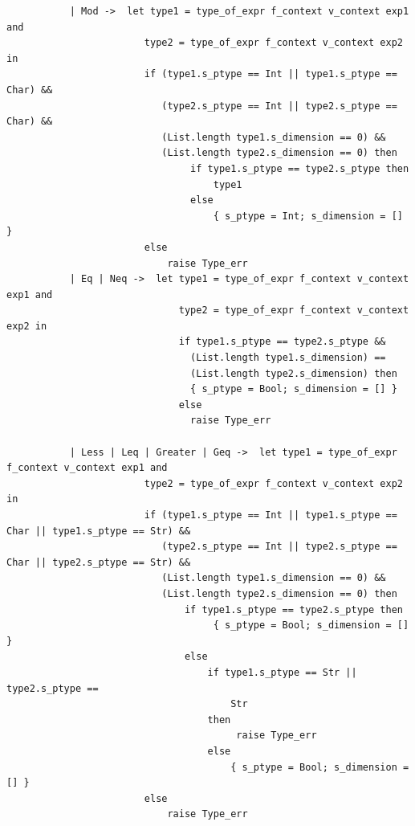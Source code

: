\documentclass[a4paper,12pt]{article}
\begin{document}
\begin{lstlisting}
           | Mod ->  let type1 = type_of_expr f_context v_context exp1 and 
                        type2 = type_of_expr f_context v_context exp2 in
                        if (type1.s_ptype == Int || type1.s_ptype == Char) && 
                           (type2.s_ptype == Int || type2.s_ptype == Char) &&
                           (List.length type1.s_dimension == 0) &&
                           (List.length type2.s_dimension == 0) then
                                if type1.s_ptype == type2.s_ptype then
                                    type1
                                else 
                                    { s_ptype = Int; s_dimension = [] }
                        else
                            raise Type_err
           | Eq | Neq ->  let type1 = type_of_expr f_context v_context exp1 and 
                              type2 = type_of_expr f_context v_context exp2 in
                              if type1.s_ptype == type2.s_ptype && 
                                (List.length type1.s_dimension) == 
                                (List.length type2.s_dimension) then
                                { s_ptype = Bool; s_dimension = [] }
                              else
                                raise Type_err

           | Less | Leq | Greater | Geq ->  let type1 = type_of_expr f_context v_context exp1 and 
                        type2 = type_of_expr f_context v_context exp2 in
                        if (type1.s_ptype == Int || type1.s_ptype == Char || type1.s_ptype == Str) &&
                           (type2.s_ptype == Int || type2.s_ptype == Char || type2.s_ptype == Str) &&
                           (List.length type1.s_dimension == 0) && 
                           (List.length type2.s_dimension == 0) then
                               if type1.s_ptype == type2.s_ptype then
                                    { s_ptype = Bool; s_dimension = [] }
                               else
                                   if type1.s_ptype == Str || type2.s_ptype ==
                                       Str
                                   then
                                        raise Type_err
                                   else 
                                       { s_ptype = Bool; s_dimension = [] }
                        else
                            raise Type_err


\end{lstlisting}
\end{document}
